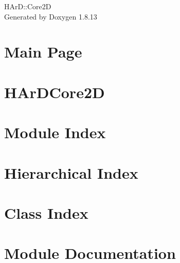 \documentclass[twoside]{book}
\newcommand{\+}{\discretionary{\mbox{\scriptsize$\hookleftarrow$}}{}{}}
\newcommand{\clearemptydoublepage}{%
  \newpage{\pagestyle{empty}\cleardoublepage}%
}
\begin{document}
\hypersetup{pageanchor=false,
             bookmarksnumbered=true,
             pdfencoding=unicode
            }
\begin{titlepage}
\vspace*{7cm}
\begin{center}%
{\Large H\+ArD\+:\+:Core2D }\\
\vspace*{1cm}
{\large Generated by Doxygen 1.8.13}\\
\end{center}
\end{titlepage}
\clearemptydoublepage
{}
\tableofcontents
\clearemptydoublepage
{}
\hypersetup{pageanchor=true}

\chapter{Main Page}
\label{index}\hypertarget{index}{}
\chapter{H\+Ar\+D\+Core2D}
\label{md_README}

\chapter{Module Index}

\chapter{Hierarchical Index}

\chapter{Class Index}

\chapter{Module Documentation}









\end{document}

